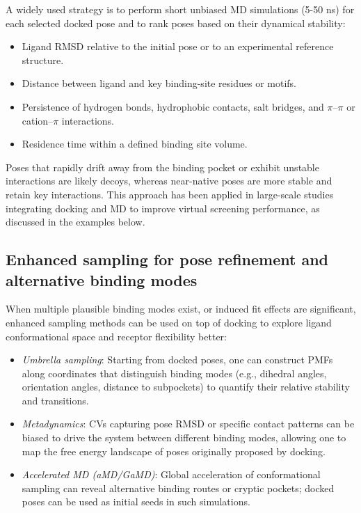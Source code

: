 \documentclass[12pt]{article}
\begin{document}
A widely used strategy is to perform short unbiased MD simulations (5-50 ns) for each selected docked pose and to rank poses based on their dynamical stability:

\begin{itemize}
\item Ligand RMSD relative to the initial pose or to an experimental reference structure.
\item Distance between ligand and key binding-site residues or motifs.
\item Persistence of hydrogen bonds, hydrophobic contacts, salt bridges, and $\pi$–$\pi$ or cation–$\pi$ interactions.
\item Residence time within a defined binding site volume.
\end{itemize}

Poses that rapidly drift away from the binding pocket or exhibit unstable interactions are likely decoys, whereas near-native poses are more stable and retain key interactions. This approach has been applied in large-scale studies integrating docking and MD to improve virtual screening performance, as discussed in the examples below.

\subsection{Enhanced sampling for pose refinement and alternative binding modes}

When multiple plausible binding modes exist, or induced fit effects are significant, enhanced sampling methods can be used on top of docking to explore ligand conformational space and receptor flexibility better:

\begin{itemize}
\item \emph{Umbrella sampling}: Starting from docked poses, one can construct PMFs along coordinates that distinguish binding modes (e.g., dihedral angles, orientation angles, distance to subpockets) to quantify their relative stability and transitions.
\item \emph{Metadynamics}: CVs capturing pose RMSD or specific contact patterns can be biased to drive the system between different binding modes, allowing one to map the free energy landscape of poses originally proposed by docking.
\item \emph{Accelerated MD (aMD/GaMD)}: Global acceleration of conformational sampling can reveal alternative binding routes or cryptic pockets; docked poses can be used as initial seeds in such simulations.
\end{itemize}
\end{document}
